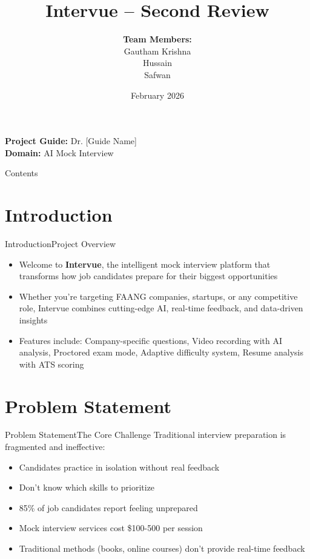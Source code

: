 \documentclass{beamer}
\title[Intervue -- Second Review]{Intervue -- Second Review}
\author[Gautham Krishna, Hussain, Safwan]{
    \textbf{Team Members:}\\
    Gautham Krishna \\
    Hussain \\
    Safwan \\
}
\date{February 2026}
\begin{document}
\begin{frame}
    \titlepage
    \begin{center}
    \small
    \textbf{Project Guide:} Dr. [Guide Name]\\
    \textbf{Domain:} AI Mock Interview
    \end{center}
\end{frame}

\begin{frame}{Contents}
    \tableofcontents
\end{frame}

\section{Introduction}
\begin{frame}{Introduction}{Project Overview}
\begin{itemize}
    \item Welcome to \textbf{Intervue}, the intelligent mock interview platform that transforms how job candidates prepare for their biggest opportunities
    \item Whether you're targeting FAANG companies, startups, or any competitive role, Intervue combines cutting-edge AI, real-time feedback, and data-driven insights
    \item Features include: Company-specific questions, Video recording with AI analysis, Proctored exam mode, Adaptive difficulty system, Resume analysis with ATS scoring
\end{itemize}
\end{frame}

\section{Problem Statement}
\begin{frame}{Problem Statement}{The Core Challenge}
Traditional interview preparation is fragmented and ineffective:
\begin{itemize}
    \item Candidates practice in isolation without real feedback
    \item Don't know which skills to prioritize
    \item 85\% of job candidates report feeling unprepared
    \item Mock interview services cost \$100-500 per session
    \item Traditional methods (books, online courses) don't provide real-time feedback
\end{itemize}
\end{frame}
\end{document}
